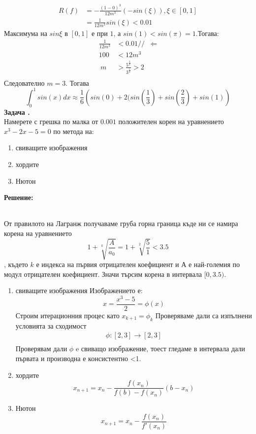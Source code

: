 \documentclass[12pt]{article}
\newcounter{problem}
\newcounter{solution}
\newcommand\problem{%
  \stepcounter{problem}%
  \textbf{Задача \theproblem.}~%
  \\
}
\newcommand\solution{%
  \textbf{Решение:}\\~%
}
\begin{document}
    \begin{align*}
        R(f)&= - \frac{(1-0)^3}{12m^3}(-sin(\xi)), \xi\in[0,1]\\
            &= \frac{1}{12m^3}sin(\xi)<0.01
    \end{align*}
    Максимума на $sin\xi$ в $[0,1]$ е при $1$, а $sin(1)<sin(\pi)=1$.Тогава:
    \begin{align*}
        \frac{1}{12m^3}&<0.01//
        &\Leftarrow\\
        100 &<12m^3\\\
        m   &> \frac{5^{\frac{2}{3}}}{3^\frac{1}{3}}>2\\
    \end{align*}
    Следователно $m=3$.
    Тогава
    \begin{equation*}
        \boxed{\int_{0}^{1}sin(x)dx\approx\frac{1}{6}\left (sin(0)+2(sin(\frac{1}{3})+sin(\frac{2}{3})+sin(1)\right )}
    \end{equation*}
    \problem
    Намерете с грешка по малка от $0.001$ положителен корен на уравнението $x^3-2x-5=0$ по метода на:
    \begin{enumerate}[a]
        \item{свиващите изображения}
        \item{хордите}
        \item{Нютон}
    \end{enumerate}
    \solution
    От правилото на Лагранж получаваме груба горна граница къде ни се намира корена на уравнението
    \begin{equation*}
      1+\sqrt[k]{\frac{A}{a_0}}=1+\sqrt[2]{\frac{5}{1}}<3.5
    \end{equation*},
    където $k$ е индекса на първия отрицателен коефициент и $А$ е най-големия по модул отрицателен коефициент.
    Значи търсим корена в интервала $[0,3.5)$.
    \begin{enumerate}[a]
        \item{свиващите изображения}
        Изображението е:
        \begin{equation*}
            x=\frac{x^3-5}{2}=\phi(x)
        \end{equation*}
        Строим итерационния процес като $x_{k+1}=\phi_k$
        Проверяваме дали са изпълнени условията за сходимост
        \begin{align*}
          \phi:[2,3]\to[2,3]\\
        \end{align*}
        Проверявам дали $\phi$ e свиващо изображение, тоест гледаме в интервала дали първата и производна е консистентно <1.
        \item{хордите}
        \begin{equation*}
            x_{n+1}=x_n-\frac{f(x_n)}{f(b)-f(x_n)}(b-x_n)
        \end{equation*}
        \item{Нютон}
        \begin{equation*}
         x_{n+1}=x_n-\frac{f(x_n)}{f'(x_n)}
        \end{equation*}
    \end{enumerate}
\end{document}
